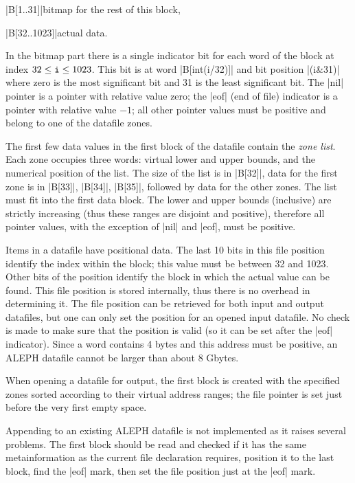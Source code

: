 \documentclass[titlepage]{article}
\newcommand\A{\textsf{ALEPH}}
\begin{document}
\HH\pp|B[1..31]|\HE bitmap for the rest of this block,

\HH\pp|B[32..1023]|\HE actual data.

\smallskip

\noindent
In the bitmap part there is a single indicator bit for each word of the
block at index
$32\le \mbox{\tt i} \le 1023$. This bit is at word \pp|B[int(i/32)]| and
bit position \pp|(i\&31)| where zero is the most significant bit and 31 is the
least significant bit. The \pp|nil| pointer is a pointer with relative value
zero; the \pp|eof| (end of file) indicator is a pointer with relative value
$-1$; all other pointer values must be positive and belong to one of the
datafile zones.

The first few data values in the first block of the datafile contain the
\emph{zone list}. Each zone occupies three words: virtual lower and upper
bounds, and the numerical position of the list. The size of the list is in
\pp|B[32]|, data for the first zone is in \pp|B[33]|, \pp|B[34]|,
\pp|B[35]|, followed by data for the other zones. The list must fit into the
first data block. The lower and upper bounds (inclusive) are strictly
increasing (thus these ranges are disjoint and positive), therefore all
pointer values, with the exception of \pp|nil| and \pp|eof|, must be
positive.

Items in a datafile have positional data. The last 10 bits in this
file position identify the index within the block; this value must be
between 32 and 1023. Other bits of the position identify the block in which
the actual value can be found. This file position is stored internally, thus
there is no overhead in determining it. The file position can be retrieved for
both input and output datafiles, but one can only set the position for an
opened input datafile. No check is made to make sure that the position is
valid (so it can be set after the \pp|eof| indicator). Since a word contains
4 bytes and this address must be positive, an \A{} datafile cannot be larger
than about 8 Gbytes.

When opening a datafile for output, the first block is created with the 
specified zones sorted according to their virtual address ranges; the
file pointer is set just before the very first empty space.

Appending to an existing \A{} datafile is not implemented as it raises
several problems. The first block should be read and checked if it has the
same metainformation as the current file declaration requires, position it
to the last block, find the \pp|eof| mark, then set the file position just
at the \pp|eof| mark.
\end{document}
